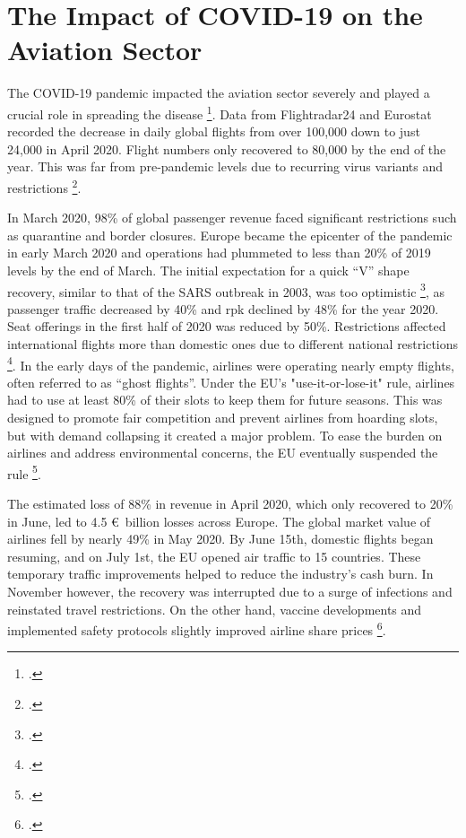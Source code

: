 \documentclass[12pt,onehalfspacing,headsepline,oneside,openright,a4paper, fleqn]{report}
\begin{document}
\newpage

\section{The Impact of COVID-19 on the Aviation Sector}

The COVID-19 pandemic impacted the aviation sector severely and played a crucial role in spreading the disease \footcite{sun2020}. Data from Flightradar24 and Eurostat recorded the decrease in daily global flights from over 100,000 down to just 24,000 in April 2020. Flight numbers only recovered to 80,000 by the end of the year. This was far from pre-pandemic levels due to recurring virus variants and restrictions \footcite[2]{dube2021b}.

In March 2020, 98\% of global passenger revenue faced significant restrictions such as quarantine and border closures. Europe became the epicenter of the pandemic in early March 2020 and operations had plummeted to less than 20\% of 2019 levels by the end of March. The initial expectation for a quick “V” shape recovery, similar to that of the SARS outbreak in 2003, was too optimistic \footcite[4]{dube2021b}, as passenger traffic decreased by 40\% and \gls{rpk} declined by 48\% for the year 2020. Seat offerings in the first half of 2020 was reduced by 50\%. Restrictions affected international flights more than domestic ones due to different national restrictions \footcite[4]{suau2020}. In the early days of the pandemic, airlines were operating nearly empty flights, often referred to as “ghost flights”. Under the EU’s "use-it-or-lose-it" rule, airlines had to use at least 80\% of their slots to keep them for future seasons. This was designed to promote fair competition and prevent airlines from hoarding slots, but with demand collapsing it created a major problem. To ease the burden on airlines and address environmental concerns, the EU eventually suspended the rule \footcite{niestadt2020}. 

The estimated loss of 88\% in revenue in April 2020, which only recovered to 20\% in June, led to 4.5 \euro~billion losses across Europe. The global market value of airlines fell by nearly 49\% in May 2020. By June 15th, domestic flights began resuming, and on July 1st, the EU opened air traffic to 15 countries. These temporary traffic improvements helped to reduce the industry’s cash burn. In November however, the recovery was interrupted due to a surge of infections and reinstated travel restrictions. On the other hand, vaccine developments and implemented safety protocols slightly improved airline share prices \footcite[3-6]{dube2021b}.
\end{document}
